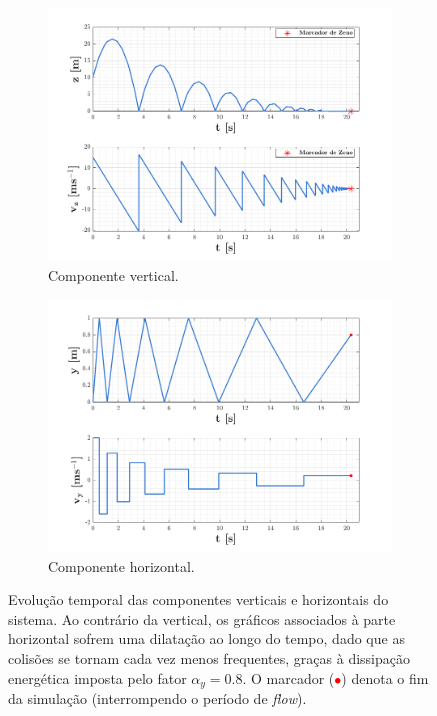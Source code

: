 \vspace{-1em}
\begin{figure}[H]
    \begin{subfigure}[b]{0.5\linewidth}
        \centering
        \includegraphics[width=1\linewidth]{img/P4/P4-z}
        \caption{Componente vertical.} 
        \label{fig:P4-z} 
    \end{subfigure}%
    \begin{subfigure}[b]{0.5\linewidth}
        \centering
        \includegraphics[width=1\linewidth]{img/P4/P4-y}
        \caption{Componente horizontal.} 
        \label{fig:P4-y} 
    \end{subfigure}%
    \caption{Evolução temporal das componentes verticais e horizontais do sistema. Ao contrário da vertical, os gráficos associados à parte horizontal sofrem uma dilatação ao longo do tempo, dado que as colisões se tornam cada vez menos frequentes, graças à dissipação energética imposta pelo fator $\alpha_y = 0.8$. O marcador (\textcolor{red}{$\bullet$}) denota o fim da simulação (interrompendo o período de \textit{flow}).}
    \label{fig:P4-z-y}
\end{figure}

